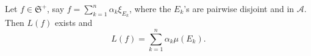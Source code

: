 Let $f \in \mathfrak{S}^+$, say $f = \sum_{k=1}^{n} \alpha_k \xi_{E_k}$, where the $E_k$'s are pairwise disjoint and in $\mathcal{A}$. Then $L(f)$ exists and $$L(f) = \sum_{k=1}^{n} \alpha_k \mu(E_k).$$
